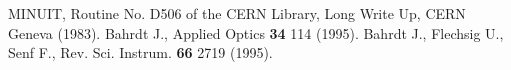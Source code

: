 


 MINUIT, Routine No. D506 of the CERN Library, Long Write Up,
CERN Geneva (1983).
 Bahrdt J., Applied Optics \textbf{34} 114 (1995). 
 Bahrdt J., Flechsig U., Senf F., Rev. Sci. Instrum. 
\textbf{66} 2719 (1995). 

